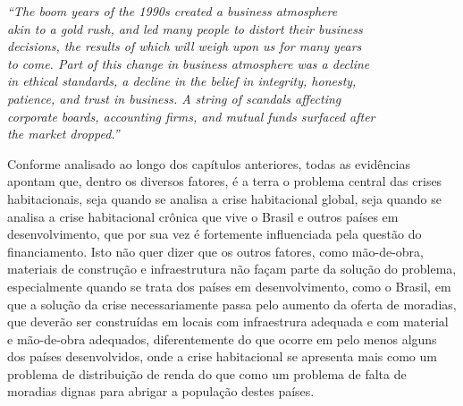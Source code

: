 \documentclass[
	12pt,				%
	oneside,			%
	a4paper,			%
	chapter=TITLE,		%
	section=TITLE,		%
	english,			%
	brazil				%
	]{abntex2}
\begin{document}
\begin{refsection}
\begin{epigrafe}
    \vspace*{\fill}
    \begin{flushright}
    \textit{``The boom years of the 1990s created a business atmosphere\\
    akin to a gold rush, and led many people to distort their business\\
    decisions, the results of which will weigh upon us for many years\\
    to come. Part of this change in business atmosphere was a decline\\
    in ethical standards, a decline in the belief in integrity, honesty,\\
    patience, and trust in business. A string of scandals affecting\\ 
    corporate boards, accounting firms, and mutual funds surfaced after\\
    the market dropped.''\\
    \cite[p. xiv]{shiller}}
    \end{flushright}
\end{epigrafe}
Conforme analisado ao longo dos capítulos anteriores, todas as evidências apontam
que, dentro os diversos fatores, é a terra o problema central das crises
habitacionais, seja quando se analisa a crise habitacional global, seja quando
se analisa a crise habitacional crônica que vive o Brasil e outros países em
desenvolvimento, que por sua vez é fortemente influenciada pela questão do
financiamento. Isto não quer dizer que os outros fatores, como mão-de-obra,
materiais de construção e infraestrutura não façam parte da solução do problema,
especialmente quando se trata dos países em desenvolvimento, como o Brasil, em
que a solução da crise necessariamente passa pelo aumento da oferta de moradias,
que deverão ser construídas em locais com infraestrura adequada e com material e
mão-de-obra adequados, diferentemente do que ocorre em pelo menos alguns dos
países desenvolvidos, onde a crise habitacional se apresenta mais como um
problema de distribuição de renda do que como um problema de falta de moradias
dignas para abrigar a população destes países.


\end{refsection}
\end{document}
